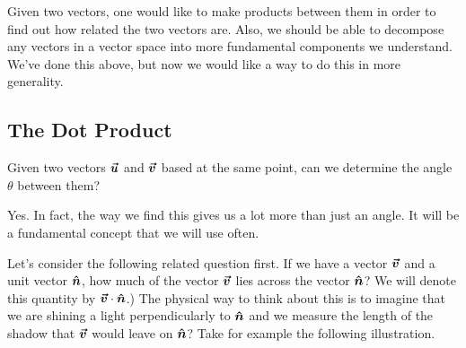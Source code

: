         Given two vectors, one would like to make products between them in order to find out how related the two vectors are.  Also, we should be able to decompose any vectors in a vector space into more fundamental components we understand.  We've done this above, but now we would like a way to do this in more generality.
        
        \subsection{The Dot Product}
        \begin{question}
        Given two vectors $\boldsymbol{\boldsymbol{\vec{u}}}$ and $\boldsymbol{\boldsymbol{\vec{v}}}$ based at the same point, can we determine the angle $\theta$ between them? 
        \end{question}
        
        \begin{center}
        \end{center}
        
        \begin{answer}
        Yes.  In fact, the way we find this gives us a lot more than just an angle.  It will be a fundamental concept that we will use often.
        \end{answer}
        
        Let's consider the following related question first.  If we have a vector $\boldsymbol{\boldsymbol{\vec{v}}}$ and a unit vector $\boldsymbol{\hat{n}}$, how much of the vector $\boldsymbol{\boldsymbol{\vec{v}}}$ lies across the vector $\boldsymbol{\hat{n}}$? We will denote this quantity by $\boldsymbol{\boldsymbol{\vec{v}}}\cdot \boldsymbol{\hat{n}}$.) The physical way to think about this is to imagine that we are shining a light perpendicularly to $\boldsymbol{\hat{n}}$ and we measure the length of the shadow that $\boldsymbol{\boldsymbol{\vec{v}}}$ would leave on $\boldsymbol{\hat{n}}$? Take for example the following illustration.
        
        \begin{center}
        \end{center}
        
